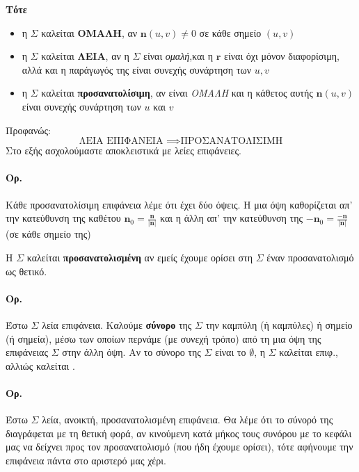 \documentclass[11pt,a4paper,titlepage,draft]{article}
\begin{document}
\textbf{Τότε}
\begin{itemize}
\item η \( \varSigma \) καλείται \textbf{ΟΜΑΛΗ}, αν \( \mathbf n(u,v) \neq 0 \) σε κάθε σημείο \( (u,v) \)
\item η \( \varSigma \) καλείται \textbf{ΛΕΙΑ}, αν η \( \varSigma \) είναι \emph{ομαλή},και η \( \mathbf r \) είναι όχι μόνον διαφορίσιμη, αλλά και η παράγωγός της είναι συνεχής συνάρτηση των \( u,v \)
\item η \( \varSigma \) καλείται \textbf{προσανατολίσιμη}, αν είναι \emph{ΟΜΑΛΗ} και η κάθετος αυτής \( \mathbf n(u,v) \) είναι συνεχής συνάρτηση των \( u \) και \( v \)
\end{itemize}

Προφανώς:
\[
\text{ΛΕΙΑ ΕΠΙΦΑΝΕΙΑ } \implies \text{ΠΡΟΣΑΝΑΤΟΛΙΣΙΜΗ}
\]
Στο εξής ασχολούμαστε αποκλειστικά με λείες επιφάνειες.

\paragraph{Ορ.}
Κάθε προσανατολίσιμη επιφάνεια λέμε ότι έχει δύο όψεις. Η μια όψη καθορίζεται απ' την κατεύθυνση της καθέτου \( \mathbf n_0 = \frac{\mathbf n}{|\mathbf n|} \) και η άλλη απ' την κατεύθυνση της \( -\mathbf n_0 = \frac{-\mathbf n}{|\mathbf n|} \) (σε κάθε σημείο της)

H \( \varSigma \) καλείται \textbf{προσανατολισμένη} αν εμείς έχουμε ορίσει στη \( \varSigma \) έναν προσανατολισμό ως θετικό.

\paragraph{Ορ.}
Έστω \( \varSigma \) λεία επιφάνεια. Καλούμε \textbf{σύνορο} της \( \varSigma \) την καμπύλη (ή καμπύλες) ή σημείο (ή σημεία), μέσω των οποίων περνάμε (με συνεχή τρόπο) από τη μια όψη της επιφάνειας \( \varSigma \) στην άλλη όψη. Αν το σύνορο της \( \varSigma \) είναι το \( \emptyset \), η \( \varSigma \) καλείται  επιφ., αλλιώς καλείται .

\paragraph{Ορ.}
Έστω \( \varSigma \) λεία, ανοικτή, προσανατολισμένη επιφάνεια. Θα λέμε ότι το σύνορό της διαγράφεται με τη θετική φορά, αν κινούμενη κατά μήκος τους συνόρου με το κεφάλι μας να δείχνει προς τον προσανατολισμό (που ήδη έχουμε ορίσει), τότε αφήνουμε την επιφάνεια πάντα στο αριστερό μας χέρι.
\end{document}
